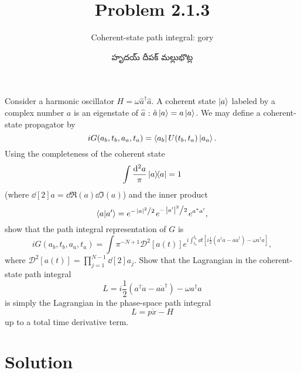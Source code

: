 \documentclass{article}
\title{Problem 2.1.3}
\subtitle{Coherent-state path integral: gory}
\author{\begin{telugu}హృదయ్ దీపక్ మల్లుభొట్ల\end{telugu}}
\date{}
\newcommand{\msr}{\mathcal{D}}
\begin{document}
	\maketitle
	Consider a harmonic oscillator $H = \omega \hat{a}^\dagger \hat{a}$.
	A coherent state $\ket{a}$ labeled by a complex number $a$ is an eigenstate of $\hat{a}$ : $\hat{a}\ket{a} = a \ket{a}$.
	We may define a coherent-state propagator by
	\begin{equation}
		i G(a_b, t_b, a_a, t_a) = \bra{a_b} U(t_b, t_a) \ket{a_a}.
	\end{equation}
	Using the completeness of the coherent state
	\begin{equation}
		\int \frac{\dd[2]{a}}{\pi}\dyad{a}{a} = 1
	\end{equation}
	(where $\dd[2]{a} = \dd{\Re(a)} \dd{\Im(a)}$) and the inner product
	\begin{equation}
		\bra{a}\ket{a'} = e^{-\flatfrac{\abs{a}^2}{2}} e^{-\flatfrac{\abs{a'}^2}{2}} e^{a^\ast a'}, \label{eq:innerproduct}
	\end{equation}
	show that the path integral representation of $G$ is
	\begin{equation}
		i G(a_b, t_b, a_a, t_a) = \int \pi^{-N + 1} \msr^2[a(t)] e^{i \int_{t_a}^{t_b} \dd{t} \left[i \frac12 \left(a^\dagger \dot{a} - a \dot{a}^\dagger \right) - \omega a^\dagger a \right]}, \label{eq:pathintegraltarget}
	\end{equation}
	where $\msr^2[a(t)] = \prod_{j=1}^{N-1} \dd[2]a_j$.
	Show that the Lagrangian in the coherent-state path integral
	\begin{equation}
		L = i\frac12 \left(a^\dagger \dot{a} - a \dot{a}^\dagger \right) - \omega a^\dagger a
	\end{equation}
	is simply the Lagrangian in the phase-space path integral
	\begin{equation}
		L = p\dot{x} - H
	\end{equation}
	up to a total time derivative term.

	\section{Solution} \label{sec:solution}
\end{document}
